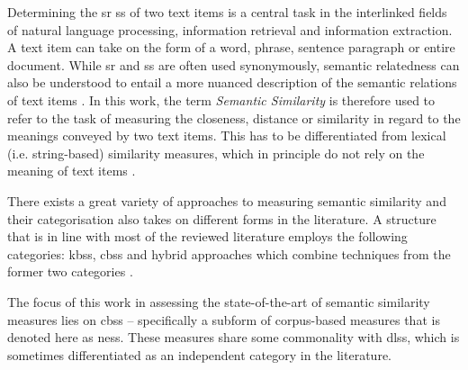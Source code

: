 \documentclass[11pt]{scrreprt}
\let\cite\parencite  %
\begin{document}
Determining the \gls{sr} \gls{ss} of two text items is a central task in the interlinked fields of natural language processing, information retrieval and information extraction. A text item can take on the form of a word, phrase, sentence paragraph or entire document. While \gls{sr} and \gls{ss} are often used synonymously, semantic relatedness can also be understood to entail a more nuanced description of the semantic relations of text items \cite{chandrasekaranEvolutionSemanticSimilarity2021, harispeSemanticSimilarityNatural2015}.  In this work, the term \textit{Semantic Similarity} is therefore used to refer to the task of measuring the closeness, distance or similarity in regard to the meanings conveyed by two text items. This has to be differentiated from lexical (i.e. string-based) similarity measures, which in principle do not rely on the meaning of text items \cite{p.SurveySemanticSimilarity2019}. 

There exists a great variety of approaches to measuring semantic similarity and their categorisation also takes on different forms in the literature.
A structure that is in line with most of the reviewed literature employs the following categories: \gls{kbss}, \gls{cbss} and hybrid approaches which combine techniques from the former two categories
\cite{chandrasekaranEvolutionSemanticSimilarity2021, harispeSemanticSimilarityNatural2015, hanSurveyTechniquesApplications2021, zadSurveyDeepLearning2021}.

The focus of this work in assessing the state-of-the-art of semantic similarity measures lies on \gls{cbss} -- specifically a subform of corpus-based measures that is denoted here as \gls{ness}. These measures share some commonality with \gls{dlss}, which is sometimes differentiated as an independent category in the literature.
\end{document}
